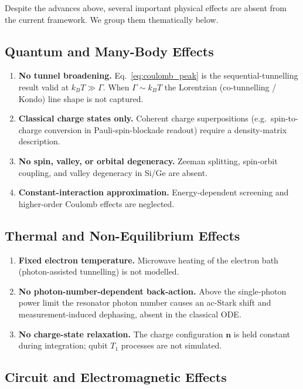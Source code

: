 \documentclass[11pt,a4paper]{article}
\begin{document}
Despite the advances above, several important physical effects are absent from
the current framework. We group them thematically below.

\subsection{Quantum and Many-Body Effects}

\begin{enumerate}[label=\alph*.]
  \item \textbf{No tunnel broadening.} Eq.~\eqref{eq:coulomb_peak} is the
    sequential-tunnelling result valid at $k_BT\gg\Gamma$. When $\Gamma\sim
    k_BT$ the Lorentzian (co-tunnelling / Kondo) line shape is not captured.
  \item \textbf{Classical charge states only.} Coherent charge superpositions
    (e.g.\ spin-to-charge conversion in Pauli-spin-blockade readout) require a
    density-matrix description.
  \item \textbf{No spin, valley, or orbital degeneracy.} Zeeman splitting,
    spin-orbit coupling, and valley degeneracy in Si/Ge are absent.
  \item \textbf{Constant-interaction approximation.} Energy-dependent
    screening and higher-order Coulomb effects are neglected.
\end{enumerate}

\subsection{Thermal and Non-Equilibrium Effects}

\begin{enumerate}[label=\alph*.]
  \item \textbf{Fixed electron temperature.} Microwave heating of the electron
    bath (photon-assisted tunnelling) is not modelled.
  \item \textbf{No photon-number-dependent back-action.} Above the
    single-photon power limit the resonator photon number causes an ac-Stark
    shift and measurement-induced dephasing, absent in the classical ODE.
  \item \textbf{No charge-state relaxation.} The charge configuration
    $\mathbf{n}$ is held constant during integration; qubit $T_1$ processes
    are not simulated.
\end{enumerate}

\subsection{Circuit and Electromagnetic Effects}
\end{document}

